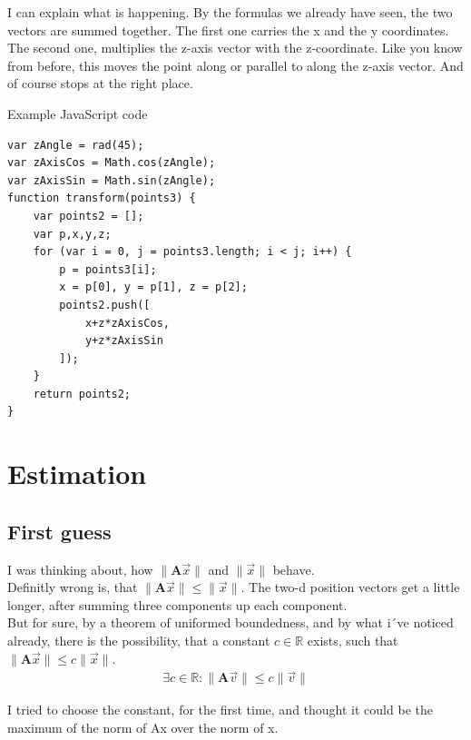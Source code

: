 \documentclass[a4paper]{article}
\begin{document}
\begin{Example}
I can explain what is happening. By the formulas we already have seen, the two vectors are summed together. The first one carries the x and the y coordinates. The second one, multiplies the z-axis vector with the z-coordinate. Like you know from before, this moves the point along or parallel to along the z-axis vector. And of course stops at the right place.


\begin{example}
Example JavaScript code
\begin{lstlisting}
var zAngle = rad(45);
var zAxisCos = Math.cos(zAngle);
var zAxisSin = Math.sin(zAngle);
function transform(points3) {
    var points2 = [];
    var p,x,y,z;
    for (var i = 0, j = points3.length; i < j; i++) {
        p = points3[i];
        x = p[0], y = p[1], z = p[2];
        points2.push([
            x+z*zAxisCos,
            y+z*zAxisSin
        ]);
    }
    return points2;
}
\end{lstlisting}
\end{example}

\section{Estimation}

\subsection{First guess}

I was thinking about, how $\|\boldsymbol{A}\vec{x}\|$ and $\|\vec{x}\|$ behave.\\

Definitly wrong is, that $\|\boldsymbol{A}\vec{x}\| \leq \|\vec{x}\|$. The two-d position vectors get a little longer, after summing three components up each component.\\ 

But for sure, by a theorem of uniformed boundedness, and by what i´ve noticed already,
there is the possibility, that a constant $c \in \mathbb{R}$ exists, such that $\|\boldsymbol{A}\vec{x}\| \leq c\|\vec{x}\|$.\\

\begin{displaymath}
\begin{align}
\exists c \in \mathbb{R}: \|\boldsymbol{A}\vec{v}\| \leq c\|\vec{v}\|
\end{align}
\end{displaymath}

I tried to choose the constant, for the first time, and thought it could be the maximum of the norm of Ax over the norm of x.


\end{Example}
\end{document}
